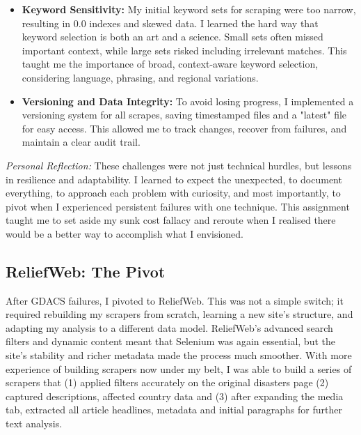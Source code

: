 \documentclass[12pt]{article}
\begin{document}
\begin{itemize}
    \item \textbf{Keyword Sensitivity:} My initial keyword sets for scraping were too narrow, resulting in 0.0 indexes and skewed data. I learned the hard way that keyword selection is both an art and a science. Small sets often missed important context, while large sets risked including irrelevant matches. This taught me the importance of broad, context-aware keyword selection, considering language, phrasing, and regional variations. 
    \item \textbf{Versioning and Data Integrity:} To avoid losing progress, I implemented a versioning system for all scrapes, saving timestamped files and a "latest" file for easy access. This allowed me to track changes, recover from failures, and maintain a clear audit trail.
\end{itemize}

\textit{Personal Reflection:} These challenges were not just technical hurdles, but lessons in resilience and adaptability. I learned to expect the unexpected, to document everything, to approach each problem with curiosity, and most importantly, to pivot when I experienced persistent failures with one technique. This assignment taught me to set aside my sunk cost fallacy and reroute when I realised there would be a better way to accomplish what I envisioned.

\subsection{ReliefWeb: The Pivot}
After GDACS failures, I pivoted to ReliefWeb. This was not a simple switch; it required rebuilding my scrapers from scratch, learning a new site's structure, and adapting my analysis to a different data model. ReliefWeb's advanced search filters and dynamic content meant that Selenium was again essential, but the site's stability and richer metadata made the process much smoother. With more experience of building scrapers now under my belt, I was able to build a series of scrapers that (1) applied filters accurately on the original disasters page (2) captured descriptions, affected country data and (3) after expanding the media tab, extracted all article headlines, metadata and initial paragraphs for further text analysis.
\end{document}
